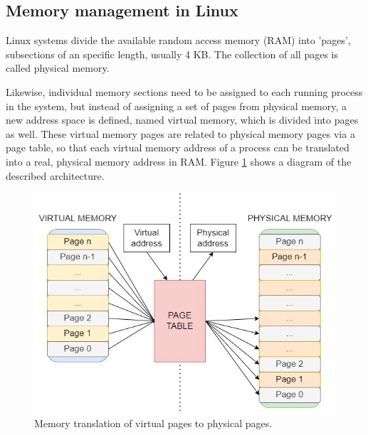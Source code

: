 \documentclass[12pt]{report} %
\begin{document}
\subsection{Memory management in Linux}
Linux systems divide the available random access memory (RAM) into 'pages', subsections of an specific length, usually 4 KB. The collection of all pages is called physical memory.

Likewise, individual memory sections need to be assigned to each running process in the system, but instead of assigning a set of pages from physical memory, a new address space is defined, named virtual memory, which is divided into pages as well. These virtual memory pages are related to physical memory pages via a page table, so that each virtual memory address of a process can be translated into a real, physical memory address in RAM\cite{mem_page_arch}. Figure \ref{fig:mem_arch_pages} shows a diagram of the described architecture.

\begin{figure}[H]
	\centering
	\includegraphics[width=13cm]{mem_arch_pages.jpg}
	\caption{Memory translation of virtual pages to physical pages.}
	\label{fig:mem_arch_pages}
\end{figure}
\end{document}
